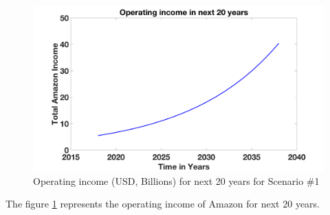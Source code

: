 \documentclass[fleqn,10pt]{SelfArx} %
\begin{document}
\begin{figure}[ht]\centering
\includegraphics[width=\linewidth]{scen1income}
\caption{Operating income (USD, Billions) for next 20 years for Scenario \#1}
\label{fig:scen1income}
\end{figure}

The figure \ref{fig:scen1income} represents the operating income of Amazon for next 20 years. 
\end{document}
